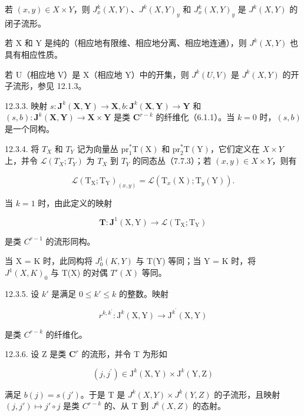 若 \((x, y) \in X \times Y\)，则 \(J_{x}^{k}(X, Y)\)、\(J^{k}(X, Y)_{y}\) 和 \(J_{x}^{k}(X, Y)_{y}\) 是 \(J^{k}(X, Y)\) 的闭子流形。

若 X 和 Y 是纯的（相应地有限维、相应地分离、相应地连通），则 \(J^{k}(X, Y)\) 也具有相应性质。

若 U（相应地 V）是 X（相应地 Y）中的开集，则 \(J^{k}(U, V)\) 是 \(J^{k}(X, Y)\) 的开子流形，参见 12.1.3。

12.3.3. 映射 \(s: \mathbf{J}^{k}(\mathbf{X}, \mathbf{Y}) \to \mathbf{X}, b: \mathbf{J}^{k}(\mathbf{X}, \mathbf{Y}) \to \mathbf{Y}\) 和 \((s, b): \mathbf{J}^{k}(\mathbf{X}, \mathbf{Y}) \to \mathbf{X} \times \mathbf{Y}\) 是类 \(\mathbf{C}^{r - k}\) 的纤维化（6.1.1）。当 \(k = 0\) 时，\((s, b)\) 是一个同构。

12.3.4. 将 \(T_{X}\) 和 \(T_{Y}\) 记为向量丛 \(\mathrm{pr}_{1}^{*}\mathrm{T}(\mathrm{X})\) 和 \(\mathrm{pr}_{2}^{*}\mathrm{T}(\mathrm{Y})\)，它们定义在 \(X \times Y\) 上，并令 \(\mathcal{L}(T_{X}; T_{Y})\) 为 \(T_{X}\) 到 \(T_{Y}\) 的同态丛（7.7.3）；若 \((x, y) \in X \times Y\)，则有

\[
\mathcal {L} (\mathrm{T} _ {\mathrm{X}}; \mathrm{T} _ {\mathrm{Y}}) _ {(x, y)} = \mathcal {L} (\mathrm{T} _ {x} (\mathrm{X}); \mathrm{T} _ {y} (\mathrm{Y})).
\]

当 \(k = 1\) 时，由此定义的映射

\[
\mathbf {T} \colon \mathbf {J} ^ {1} (\mathrm{X}, \mathrm{Y}) \rightarrow \mathcal {L} (\mathrm{T} _ {\mathrm{X}}; \mathrm{T} _ {\mathrm{Y}})
\]

是类 \(C^{r-1}\) 的流形同构。

当 X = K 时，此同构将 \(J_{0}^{1}(K, Y)\) 与 T(Y) 等同；当 Y = K 时，将 \(J^{1}(X, K)_{0}\) 与 T(X) 的对偶 \(T'(X)\) 等同。

12.3.5. 设 \(k'\) 是满足 \(0 \leqslant k' \leqslant k\) 的整数。映射

\[
r ^ {k, k ^ {\prime}}: \mathrm{J} ^ {k} (\mathrm{X}, \mathrm{Y}) \rightarrow \mathrm{J} ^ {k ^ {\prime}} (\mathrm{X}, \mathrm{Y})\tag{cf. 12.1.5}
\]

是类 \(C^{r-k}\) 的纤维化。

12.3.6. 设 Z 是类 \(\mathbf{C}^r\) 的流形，并令 T 为形如

\[
(j, j ^ {\prime}) \in \mathrm{J} ^ {k} (\mathrm{X}, \mathrm{Y}) \times \mathrm{J} ^ {k} (\mathrm{Y}, \mathrm{Z})
\]

满足 \(b(j) = s(j')\)。于是 T 是 \(J^k(X, Y) \times J^k(Y, Z)\) 的子流形，且映射 \((j, j') \mapsto j' \circ j\) 是类 \(C^{r-k}\) 的、从 T 到 \(J^k(X, Z)\) 的态射。

